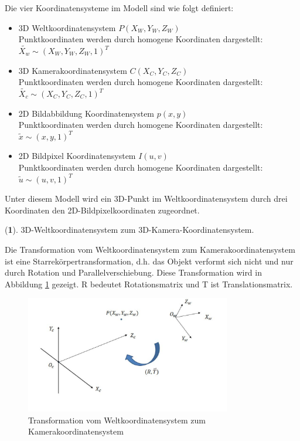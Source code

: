 Die vier Koordinatensysteme im Modell sind wie folgt definiert:

\begin{itemize}
	\item 3D Weltkoordinatensystem $P(X_W,Y_W,Z_W)$ \\
	Punktkoordinaten werden durch homogene Koordinaten dargestellt: $\widetilde{X_w}\sim(X_W,Y_W,Z_W,1)^T$
	\item 3D Kamerakoordinatensystem $C(X_C,Y_C,Z_C)$\\
	Punktkoordinaten werden durch homogene Koordinaten dargestellt: $\widetilde{X_c}\sim(X_C,Y_C,Z_C,1)^T$
	\item 2D Bildabbildung Koordinatensystem $p(x,y)$\\
	Punktkoordinaten werden durch homogene Koordinaten dargestellt: $\widetilde{x}\sim(x,y,1)^T$
	\item 2D Bildpixel Koordinatensystem $I(u,v)$\\
	Punktkoordinaten werden durch homogene Koordinaten dargestellt: $\widetilde{u}\sim(u,v,1)^T$
\end{itemize}

Unter diesem Modell wird ein 3D-Punkt im Weltkoordinatensystem durch drei Koordinaten den 2D-Bildpixelkoordinaten zugeordnet.

(\textbf{1}). 3D-Weltkoordinatensystem zum 3D-Kamera-Koordinatensystem.

Die Transformation vom Weltkoordinatensystem zum Kamerakoordinatensystem ist eine Starrekörpertransformation, d.h. das Objekt verformt sich nicht und nur durch Rotation und Parallelverschiebung. Diese Transformation wird in Abbildung \ref{fig:WzuC} gezeigt. R bedeutet Rotationsmatrix und T ist Translationsmatrix.

\begin{figure}[htb]
 \centering 
 \includegraphics[keepaspectratio,width=0.8\textwidth]{images/3_Ersteverfahren/Kamera/WzuC.pdf}
 \caption{Transformation vom Weltkoordinatensystem zum Kamerakoordinatensystem}
 \label{fig:WzuC}
\end{figure} 

